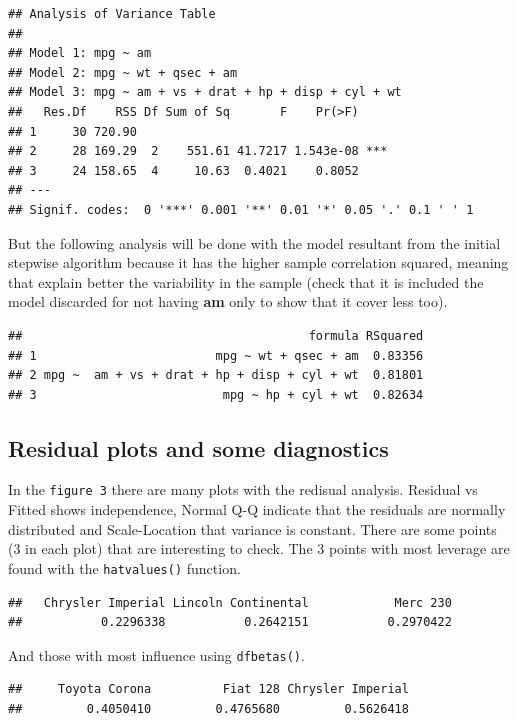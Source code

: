 \documentclass[]{article}
\begin{document}
\begin{verbatim}
## Analysis of Variance Table
## 
## Model 1: mpg ~ am
## Model 2: mpg ~ wt + qsec + am
## Model 3: mpg ~ am + vs + drat + hp + disp + cyl + wt
##   Res.Df    RSS Df Sum of Sq       F    Pr(>F)    
## 1     30 720.90                                   
## 2     28 169.29  2    551.61 41.7217 1.543e-08 ***
## 3     24 158.65  4     10.63  0.4021    0.8052    
## ---
## Signif. codes:  0 '***' 0.001 '**' 0.01 '*' 0.05 '.' 0.1 ' ' 1
\end{verbatim}

But the following analysis will be done with the model resultant from
the initial stepwise algorithm because it has the higher sample
correlation squared, meaning that explain better the variability in the
sample (check that it is included the model discarded for not having
\textbf{am} only to show that it cover less too).

\begin{verbatim}
##                                        formula RSquared
## 1                         mpg ~ wt + qsec + am  0.83356
## 2 mpg ~  am + vs + drat + hp + disp + cyl + wt  0.81801
## 3                          mpg ~ hp + cyl + wt  0.82634
\end{verbatim}

\subsection{Residual plots and some
diagnostics}\label{residual-plots-and-some-diagnostics}

In the \texttt{figure 3} there are many plots with the redisual
analysis. Residual vs Fitted shows independence, Normal Q-Q indicate
that the residuals are normally distributed and Scale-Location that
variance is constant. There are some points (3 in each plot) that are
interesting to check. The 3 points with most leverage are found with the
\texttt{hatvalues()} function.

\begin{verbatim}
##   Chrysler Imperial Lincoln Continental            Merc 230 
##           0.2296338           0.2642151           0.2970422
\end{verbatim}

And those with most influence using \texttt{dfbetas()}.

\begin{verbatim}
##     Toyota Corona          Fiat 128 Chrysler Imperial 
##         0.4050410         0.4765680         0.5626418
\end{verbatim}
\end{document}
